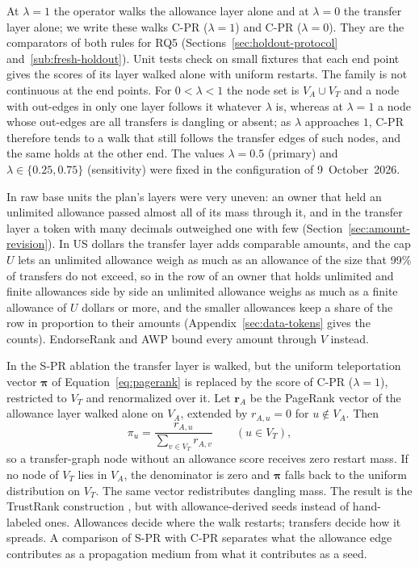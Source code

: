 At $\lambda=1$ the operator walks the allowance layer alone and at $\lambda=0$ the transfer layer alone; we write these walks C-PR ($\lambda=1$) and C-PR ($\lambda=0$). They are the comparators of both rules for RQ5 (Sections~\ref{sec:holdout-protocol} and~\ref{sub:fresh-holdout}). Unit tests check on small fixtures that each end point gives the scores of its layer walked alone with uniform restarts. The family is not continuous at the end points. For $0<\lambda<1$ the node set is $V_A\cup V_T$ and a node with out-edges in only one layer follows it whatever $\lambda$ is, whereas at $\lambda=1$ a node whose out-edges are all transfers is dangling or absent; as $\lambda$ approaches $1$, C-PR therefore tends to a walk that still follows the transfer edges of such nodes, and the same holds at the other end. The values $\lambda=0.5$ (primary) and $\lambda\in\{0.25,0.75\}$ (sensitivity) were fixed in the configuration of 9~October~2026.

In raw base units the plan's layers were very uneven: an owner that held an unlimited allowance passed almost all of its mass through it, and in the transfer layer a token with many decimals outweighed one with few (Section~\ref{sec:amount-revision}). In US dollars the transfer layer adds comparable amounts, and the cap $U$ lets an unlimited allowance weigh as much as an allowance of the size that 99\% of transfers do not exceed, so in the row of an owner that holds unlimited and finite allowances side by side an unlimited allowance weighs as much as a finite allowance of $U$ dollars or more, and the smaller allowances keep a share of the row in proportion to their amounts (Appendix~\ref{sec:data-tokens} gives the counts). EndorseRank and AWP bound every amount through $V$ instead.

In the S-PR ablation the transfer layer is walked, but the uniform teleportation vector $\boldsymbol{\pi}$ of Equation~\eqref{eq:pagerank} is replaced by the score of C-PR ($\lambda=1$), restricted to $V_T$ and renormalized over it. Let $\mathbf{r}_{A}$ be the PageRank vector of the allowance layer walked alone on $V_A$, extended by $r_{A,u}=0$ for $u\notin V_A$. Then
\[
\pi_u=\frac{r_{A,u}}{\sum_{v\in V_T} r_{A,v}}\qquad(u\in V_T),
\]
so a transfer-graph node without an allowance score receives zero restart mass. If no node of $V_T$ lies in $V_A$, the denominator is zero and $\boldsymbol{\pi}$ falls back to the uniform distribution on $V_T$. The same vector redistributes dangling mass. The result is the TrustRank construction \parencite{gyongyi2004trustrank}, but with allowance-derived seeds instead of hand-labeled ones. Allowances decide where the walk restarts; transfers decide how it spreads. A comparison of S-PR with C-PR separates what the allowance edge contributes as a propagation medium from what it contributes as a seed.

